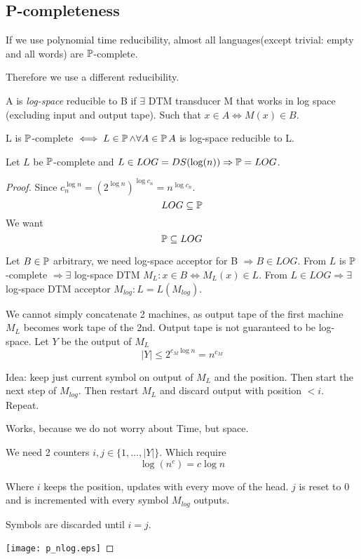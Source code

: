 \subsection{P-completeness}

\begin{note}
	If we use polynomial time reducibility, almost all languages(except trivial: empty and all words) are $\TP$-complete.

	Therefore we use a different reducibility.
\end{note}

\begin{definition}\label{log_red}
	A is \emph{log-space} reducible to B if $\exists$ DTM transducer M that works in log space (excluding input and output tape).
	Such that $x \in A \iff M(x) \in B $.
\end{definition}

\begin{definition}[$\TP$-complete]
	L is $\TP$-complete $\iff L \in \operatorname{\mathbb{P}} \land \forall A \in \operatorname{\mathbb{P}} A$ is log-space reducible to L.
\end{definition}

\begin{theorem}\label{p_comp_log}
	Let $L$ be $\TP$-complete and $L \in LOG = DS(\log(n)) \Rightarrow \operatorname{\mathbb{P}} = LOG$.
\end{theorem}
\begin{proof}
	Since $c_n^{\log n} = (2^{\log n})^{\log c_n} = n^{\log c_n}$.
	\[ LOG \subseteq \operatorname{\mathbb{P}} \]
	We want
	\[ \operatorname{\mathbb{P}} \subseteq LOG \]

	Let $B \in \operatorname{\mathbb{P}}$ arbitrary, we need log-space acceptor for B $\Rightarrow B \in LOG$.
	From $L$ is $\TP$-complete $\Rightarrow \exists$ log-space DTM $M_L: x \in B \iff M_L(x) \in L$.
	From $L \in LOG \Rightarrow \exists $ log-space DTM acceptor $M_{log}: L = L(M_{log}) $.

	We cannot simply concatenate 2 machines, as output tape of the first machine $M_L$ becomes work tape of the 2nd.
	Output tape is not guaranteed to be log-space.
	Let $Y$ be the output of $M_L$
	\[ |Y| \leq 2^{c_M \log n} = n^{c_M} \]

	Idea: keep just current symbol on output of $M_L$ and the position.
	Then start the next step of $M_{log}$.
	Then restart $M_L$ and discard output with position $ < i$.
	Repeat.

	Works, because we do not worry about Time, but space.

	We need 2 counters $i, j \in \{ 1, \ldots, |Y| \}$.
	Which require
	\[ \log(n^c) = c \log n \]

	Where $i$ keeps the position, updates with every move of the head.
	$j$ is reset to $0$ and is incremented with every symbol $M_{log}$ outputs.

	Symbols are discarded until $i = j$.

	\texttt{[image: p\_nlog.eps]}
\end{proof}

